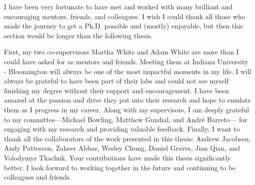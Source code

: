 \documentclass[\main/thesis.tex]{subfiles}
\begin{document}
\begin{acknowledgements}

I have been very fortunate to have met and worked with many brilliant and encouraging mentors, friends, and colleagues. I wish I could thank all those who made the journey to get a Ph.D. possible and (mostly) enjoyable, but then this section would be longer than the following thesis.

First, my two co-supervisors Martha White and Adam White are more than I could have asked for as mentors and friends. Meeting them at Indiana University - Bloomington will always be one of the most impactful moments in my life. I will always be grateful to have been part of their labs and could not see myself finishing my degree without their support and encouragement. I have been amazed at the passion and drive they put into their research and hope to emulate them as I progress in my career. Along with my supervisors, I am deeply grateful to my committee---Michael Bowling, Matthew Guzdial, and Andr\'{e} Barreto--- for engaging with my research and providing valuable feedback. Finally, I want to thank all the collaborators of the work presented in this thesis: Andrew Jacobsen, Andy Patterson, Zaheer Abbas, Wesley Chung, Daniel Graves, Jian Qian, and Volodymyr Tkachuk. Your contributions have made this thesis significantly better. I look forward to working together in the future and continuing to be colleagues and friends.


\end{acknowledgements}
\end{document}
